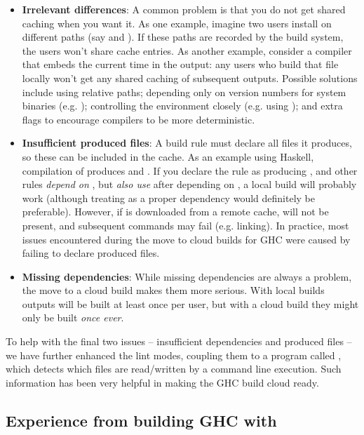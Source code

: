 \begin{itemize}
\item \textbf{Irrelevant differences}: A common problem is that you do not get
      shared caching when you want it. As one example, imagine two users install
       on different paths (say  and ).
      If these paths are recorded by the build system, the users won't share
      cache entries. As another example, consider a compiler that embeds the current time
      in the output: any users who build that file locally won't get any shared
      caching of subsequent outputs. Possible solutions include using relative paths;
      depending only on version numbers for system binaries (e.g. );
      controlling the environment closely (e.g. using \Nix); and extra flags to
      encourage compilers to be more deterministic.
\item \textbf{Insufficient produced files}: A build rule must declare all files
      it produces, so these can be included in the cache.
      As an example using Haskell, compilation of  produces
       and . If you declare the rule as producing ,
      and other rules \emph{depend on} , but \emph{also use}  after
      depending on , a local build will probably work (although treating 
      as a proper dependency would definitely be preferable). However,
      if  is downloaded from a remote cache,  will not be present,
      and subsequent commands may fail (e.g. linking).
      In practice, most issues encountered
      during the move to cloud builds for GHC were caused by failing to declare produced
      files.
\item \textbf{Missing dependencies}: While missing dependencies are
      always a problem, the move to a cloud build makes them more serious.
      With local builds outputs will be built at least once per user, but with a
      cloud build they might only be built \emph{once ever}.
\end{itemize}

To help with the final two issues -- insufficient dependencies and produced
files -- we have further enhanced the \Shake lint modes, coupling them to a
program called , which detects which files are read/written by a
command line execution. Such information has been very helpful in making the GHC
build cloud ready.

\subsection{Experience from building GHC with \Shake}

